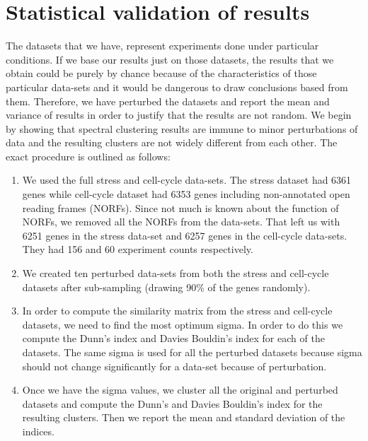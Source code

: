 \section{Statistical validation of results}
The datasets that we have, represent experiments done under particular conditions. If we base our results just on 
those datasets, the results that we obtain could be purely by chance because of the characteristics of those 
particular data-sets and it would be dangerous to draw conclusions based from them. 
Therefore, we have perturbed the datasets and report the mean and variance of results in order to justify that 
the results are not random. We begin by showing that spectral clustering results are immune to minor 
perturbations of data and the resulting clusters are not widely different from each other. The exact procedure 
is outlined as follows:

\begin{enumerate}
  
\item We used the full stress and cell-cycle data-sets. The stress dataset had 6361 genes while cell-cycle dataset had 6353 genes including non-annotated open reading frames (NORFs). Since not much is known about the function of NORFs, we removed all the NORFs from the data-sets. 
That left us with 6251 genes in the stress data-set and 6257 genes in the cell-cycle data-sets. They had 156 and 60 experiment counts respectively.
 
\item We created ten perturbed data-sets from both the stress and cell-cycle datasets after sub-sampling (drawing 90\% of the genes randomly).

\item In order to compute the similarity matrix from the stress and cell-cycle datasets, we need to find the most optimum sigma. In order to do this we compute the Dunn's index and Davies Bouldin's index for each of the datasets. The same sigma is used for all the perturbed datasets because sigma should not change significantly for a data-set because of perturbation.

\item Once we have the sigma values, we cluster all the original and perturbed datasets and compute the Dunn's and Davies Bouldin's index for the resulting clusters. 
Then we report the mean and standard deviation of the indices. 
\end{enumerate}

